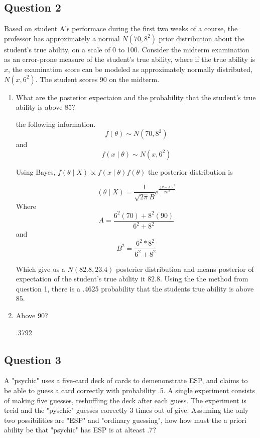 \documentclass{tufte-book}
\theoremstyle{mytheoremstyle}
\theoremstyle{mylemstyle}
\theoremstyle{mydefstyle}
\begin{document}
\subsection{Question 2}
Based on student A's performace during the first two weeks of a course, the professor has approximately a normal $N(70, 8^2)$ prior distribution about the student's true ability, on a scale of 0 to 100.  Consider the midterm examination as an error-prone measure of the student's true ability, where if the true ability is $x$, the examination score can be modeled as approximately normally distributed, $N(x,6^2)$.  The student scores 90 on the midterm.

\begin{enumerate}
\item What are the posterior expectaion and the probability that the student's true ability is above 85?

 the following information.
    \[f(\theta) \sim N(70, 8^2) \]
 and
    \[f(x\mid \theta)\sim N(x, 6^2)\]

Using Bayes, $f(\theta\mid X) \propto f(x\mid \theta)f(\theta)$ the posterior distribution is

\[ (\theta\mid X) = \frac{1}{\sqrt{2\pi}B}e^{\frac{(\theta-A)^2}{2B^2}} \]
Where
\[ A = \frac{6^2(70) + 8^2(90)}{6^2 + 8^2} \]
and
\[B^2 = \frac{6^2*8^2}{6^2 + 8^2} \]

Which give us a $N(82.8, 23.4)$ posterier distribution and means posterior of expectation of the student's true ability it $82.8$.  Using the the method from question 1, there is a .4625 probability that the students true ability is above $85$.

\item Above 90?

.3792

\end{enumerate}


\subsection{Question 3}
A "psychic" uses a five-card deck of cards to demenonstrate ESP, and claims to be able to guess a card correctly with probability .5.  A single experiment consists of making five guesses, reshuffling the deck after each guess.  The experiment is treid and the "pyschic" guesses correctly 3 times out of give.  Assuming the only two possibilities are "ESP" and "ordinary guessing", how how must the a priori ability be that "psychic" has ESP is at alteast .7?
\end{document}
